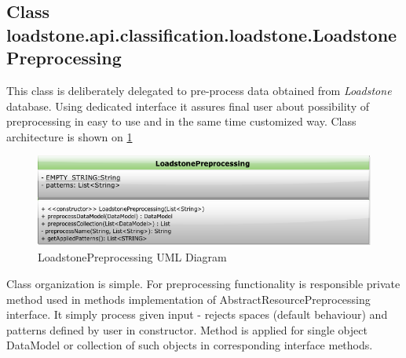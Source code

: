 \subsection{Class \newline loadstone.api.classification.loadstone.\newline LoadstonePreprocessing}
This class is deliberately delegated to pre-process data obtained from \textit{Loadstone} database. Using dedicated interface it assures final user about possibility of preprocessing in easy to use and in the same time customized way. Class architecture is shown on \ref{fig:@=LoadstonePreprocessing}
\begin{figure}[h]
	\centering
	\includegraphics[scale=0.5]{LoadstonePreprocessing.png}
	\caption{LoadstonePreprocessing UML Diagram}
	\label{fig:@=LoadstonePreprocessing}
\end{figure}
Class organization is simple. For preprocessing functionality is responsible private method used in methods implementation of AbstractResourcePreprocessing interface. It simply process given input - rejects spaces (default behaviour) and patterns defined by user in constructor. Method is applied for single object DataModel or collection of such objects in corresponding interface methods.
